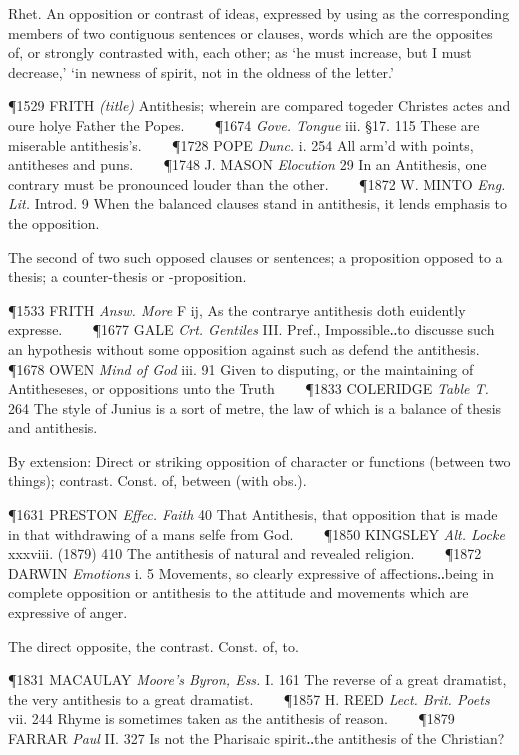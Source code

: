 \begin{description}[wide, labelwidth=!, labelindent=0pt]
\begin{myenumerate}

 Rhet. An opposition or contrast of ideas, expressed by using as the corresponding members of two contiguous sentences or clauses, words which are the opposites of, or strongly contrasted with, each other; as ‘he must increase, but I must decrease,’ ‘in newness of spirit, not in the oldness of the letter.’

\P 1529 FRITH  \textit{(title)} Antithesis; wherein are compared togeder Christes actes and oure holye Father the Popes.    
\P 1674 \textit{Gove. Tongue} iii. §17. 115 These are miserable antithesis's.    
\P 1728 POPE  \textit{Dunc.} i. 254 All arm'd with points, antitheses and puns.    
\P 1748 J. MASON  \textit{Elocution} 29 In an Antithesis, one contrary must be pronounced louder than the other.    
\P 1872 W. MINTO  \textit{Eng. Lit.} Introd. 9 When the balanced clauses stand in antithesis, it lends emphasis to the opposition.

 The second of two such opposed clauses or sentences; a proposition opposed to a thesis; a counter-thesis or -proposition.

\P 1533 FRITH  \textit{Answ. More} F ij, As the contrarye antithesis doth euidently expresse.    
\P 1677 GALE  \textit{Crt. Gentiles} III. Pref., Impossible‥to discusse such an hypothesis without some opposition against such as defend the antithesis.    
\P 1678 OWEN  \textit{Mind of God} iii. 91 Given to disputing, or the maintaining of Antitheseses, or oppositions unto the Truth    
\P 1833 COLERIDGE  \textit{Table T.} 264 The style of Junius is a sort of metre, the law of which is a balance of thesis and antithesis.

 By extension: Direct or striking opposition of character or functions (between two things); contrast. Const. of, between (with obs.).

\P 1631 PRESTON  \textit{Effec. Faith} 40 That Antithesis, that opposition that is made in that withdrawing of a mans selfe from God.    
\P 1850 KINGSLEY  \textit{Alt. Locke} xxxviii. (1879) 410 The antithesis of natural and revealed religion.    
\P 1872 DARWIN  \textit{Emotions} i. 5 Movements, so clearly expressive of affections‥being in complete opposition or antithesis to the attitude and movements which are expressive of anger.

 The direct opposite, the contrast. Const. of, to.

\P 1831 MACAULAY  \textit{Moore's Byron, Ess.} I. 161 The reverse of a great dramatist, the very antithesis to a great dramatist.    
\P 1857 H. REED  \textit{Lect. Brit. Poets} vii. 244 Rhyme is sometimes taken as the antithesis of reason.    
\P 1879 FARRAR  \textit{Paul} II. 327 Is not the Pharisaic spirit‥the antithesis of the Christian?


\end{myenumerate}
\end{description}
